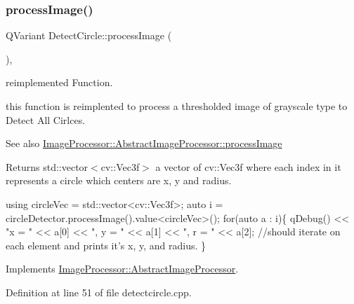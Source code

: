 \subsubsection{\texorpdfstring{process\+Image()}{processImage()}}
{\footnotesize\ttfamily Q\+Variant Detect\+Circle\+::process\+Image (\begin{DoxyParamCaption}{ }\end{DoxyParamCaption})\hspace{0.3cm}{\ttfamily [override]}, {\ttfamily [virtual]}}



reimplemented Function. 

this function is reimplented to process a thresholded image of grayscale type to Detect All Cirlces. \begin{DoxySeeAlso}{See also}
\hyperlink{class_image_processor_1_1_abstract_image_processor_ad033ae911918b0f6842b7b1d6cdd2b90}{Image\+Processor\+::\+Abstract\+Image\+Processor\+::process\+Image} 
\end{DoxySeeAlso}
\begin{DoxyReturn}{Returns}
std\+::vector$<$cv\+::\+Vec3f$>$ a vector of cv\+::\+Vec3f where each index in it represents a circle which centers are x, y and radius. 
\begin{DoxyCode}
\textcolor{keyword}{using} circleVec = std::vector<cv::Vec3f>;
\textcolor{keyword}{auto} i = circleDetector.processImage().value<circleVec>();
\textcolor{keywordflow}{for}(\textcolor{keyword}{auto} a : i)\{
     qDebug() << \textcolor{stringliteral}{"x = "} << a[0] << \textcolor{stringliteral}{", y = "} << a[1] << \textcolor{stringliteral}{", r = "} << a[2]; \textcolor{comment}{//should iterate on each element
       and prints it's x, y, and radius.}
\}
\end{DoxyCode}
 
\end{DoxyReturn}


Implements \hyperlink{class_image_processor_1_1_abstract_image_processor_ad033ae911918b0f6842b7b1d6cdd2b90}{Image\+Processor\+::\+Abstract\+Image\+Processor}.



Definition at line 51 of file detectcircle.\+cpp.

